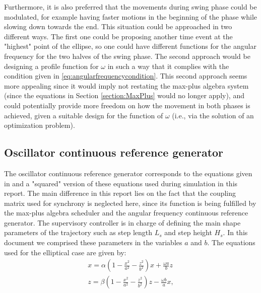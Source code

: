 \documentclass[main.tex]{subfiles}
\begin{document}
Furthermore, it is also preferred that the movements during swing phase could be modulated, for example having faster motions in the beginning of the phase while slowing down towards the end. This situation could be approached in two different ways. The first one could be proposing another time event at the "highest" point of the ellipse, so one could have different functions for the angular frequency for the two halves of the swing phase. The second approach would be designing a profile function for $\omega$ in such a way that it complies with the condition given in \ref{eq:angularfrequencycondition}. This second approach seems more appealing since it would imply not restating the max-plus algebra system (since the equations in Section \ref{section:MaxPlus} would no longer apply), and could potentially provide more freedom on how the movement in both phases is achieved, given a suitable design for the function of $\omega$ (i.e., via the solution of an optimization problem).
\subsection{Oscillator continuous reference generator}
The oscillator continuous reference generator corresponds to the equations given in \cite{Barasuol2013} and a "squared" version of these equations used during simulation in this report. The main difference in this report lies on the fact that the coupling matrix used for synchrony is neglected here, since its function is being fulfilled by the max-plus algebra scheduler and the angular frequency continuous reference generator. The supervisory controller is in charge of defining the main shape parameters of the trajectory such as step length $L_s$ and step height $H_s$. In this document we comprised these parameters in the variables $a$ and $b$. The equations used for the elliptical case are given by:
\begin{align}
x = \alpha (1 - \frac{x^2}{a^2} - \frac{z^2}{b^2})x + \frac{\omega a}{b}z \\
z = \beta (1 - \frac{x^2}{a^2} - \frac{z^2}{b^2})z - \frac{\omega b}{a}x,
\end{align}
\end{document}
